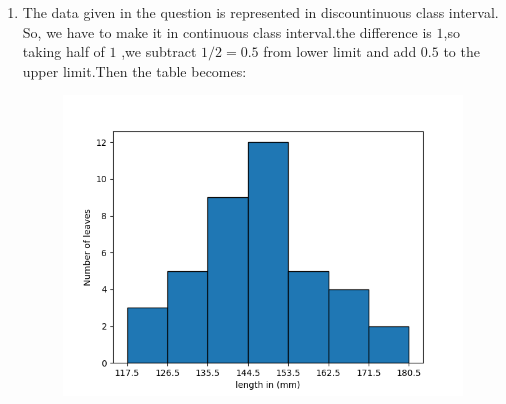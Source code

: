 \documentclass[12pt,twocolumn]{IEEEtran}
\begin{document}
\begin{enumerate}[label=(\roman*)]
	\item The data given in the question is represented in discountinuous class interval. So, we have to make it in continuous class interval.the difference is $1$,so taking half of $1$ ,we subtract $1/2=0.5$ from lower limit and add $0.5$ to the upper limit.Then the table becomes:
	      \begin{table}[ht!]
		      \begin{center}
			      
			      \vspace*{3pt}
			      \caption{}
			      \label{table:table2}
		      \end{center}
	      \end{table}
	      \begin{figure}[ht!]
		      \begin{center}
			      \includegraphics[width=\columnwidth]{fig/Picture_1.png}
			      \caption{}
			      \label{fig:fig1}
		      \end{center}


\end{figure}
\end{enumerate}
\end{document}

